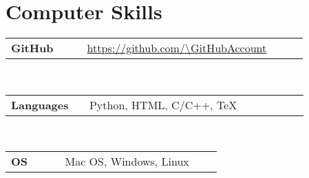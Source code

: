 \newcommand{\skill}[2]
  {\small \color{maincolor}
    \begin{tabular}{@{} p{0.22\linewidth} p{0.64\linewidth}}
      \textbf{\color{hlcolor-0} #1} & \textcolor{maincolor}{#2}
    \end{tabular}}
  
\newcommand{\github}
  {\small \url{https://github.com/\GitHubAccount}}

\newcommand{\gitlab}
  {\small \url{https://gitlab.cern.ch/mabarbet}}


\section*{Computer Skills}
\begin{cvcontent}
  \skill{GitHub}{\github}\\ [0.5mm]
  \skill{Languages}{Python, HTML, C/C++, TeX}\\ [0.5mm]
  \skill{OS}{Mac OS, Windows, Linux}
\end{cvcontent}
